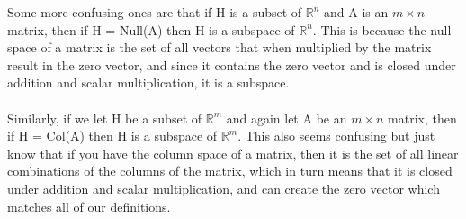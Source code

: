\documentclass{report}
\begin{document}
\begin{multicols}{2}
Some more confusing ones are that if H is a subset of $ \mathbb{R}^{ n } $ and A is an $ m \times n $ matrix, then if H = Null(A) then H is a subspace of $ \mathbb{R}^{ n } $. This is because the null space of a matrix is the set of all vectors that when multiplied by the matrix result in the zero vector, and since it contains the zero vector and is closed under addition and scalar multiplication, it is a subspace. \\\\
Similarly, if we let H be a subset of $ \mathbb{R}^{ m } $ and again let A be an $ m \times n $ matrix, then if H = Col(A) then H is a subspace of $ \mathbb{R}^{ m } $. This also seems confusing but just know that if you have the column space of a matrix, then it is the set of all linear combinations of the columns of the matrix, which in turn means that it is closed under addition and scalar multiplication, and can create the zero vector which matches all of our definitions. \\\\

\end{multicols}
\end{document}
